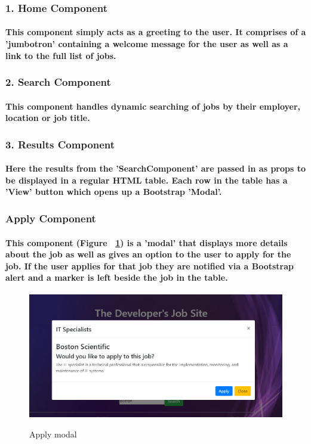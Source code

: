 \subsubsection{1. Home Component}
\paragraph{This component simply acts as a greeting to the user. It comprises of a 'jumbotron' containing a welcome message for the user as well as a link to the full list of jobs.}
\subsubsection{2. Search Component}
\paragraph{This component handles dynamic searching of jobs by their employer, location or job title.}
\subsubsection{3. Results Component}
\paragraph{Here the results from the 'SearchComponent' are passed in as props to be displayed in a regular HTML table. Each row in the table has a 'View' button which opens up a Bootstrap 'Modal'.}
\subsubsection{Apply Component}
\paragraph{This component (Figure ~\ref{apply_label}) is a 'modal' that displays more details about the job as well as gives an option to the user to apply for the job. If the user applies for that job they are notified via a Bootstrap alert and a marker is left beside the job in the table.}
\begin{figure}[ht]
    \centering
    \includegraphics[scale=0.4]{Images/apply.png} 
    \label{apply_label}
    \caption{Apply modal}
\end{figure}
